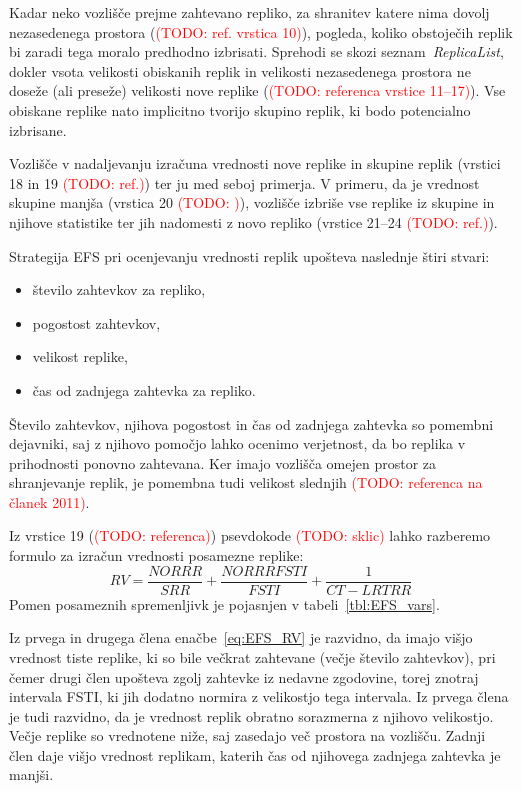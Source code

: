 \documentclass[a4paper, 12pt]{book}
\newcommand{\TODO}[1]{\textcolor{red}{(TODO: #1)}}
\begin{document}
Kadar neko vozlišče prejme zahtevano repliko, za shranitev katere nima dovolj
nezasedenega prostora (\TODO{ref. vrstica 10}), pogleda, koliko
obstoječih replik bi zaradi tega moralo predhodno izbrisati. Sprehodi se skozi
seznam~\textit{\mbox{ReplicaList}}, dokler vsota velikosti obiskanih replik in
velikosti nezasedenega prostora ne doseže (ali preseže) velikosti nove replike
(\TODO{referenca vrstice 11--17}). Vse obiskane replike nato implicitno
tvorijo skupino replik, ki bodo potencialno izbrisane.

Vozlišče v nadaljevanju izračuna vrednosti nove replike in skupine replik
(vrstici 18 in 19 \TODO{ref.}) ter ju med seboj primerja. V primeru, da je
vrednost skupine manjša (vrstica 20 \TODO{}), vozlišče izbriše vse replike
iz skupine in njihove statistike ter jih nadomesti z novo repliko
(vrstice 21--24 \TODO{ref.}).

Strategija EFS pri ocenjevanju vrednosti replik upošteva naslednje štiri
stvari:
\begin{itemize}
  \item število zahtevkov za repliko,
  \item pogostost zahtevkov,
  \item velikost replike,
  \item čas od zadnjega zahtevka za repliko.
\end{itemize}

Število zahtevkov, njihova pogostost in čas od zadnjega zahtevka so pomembni
dejavniki, saj z njihovo pomočjo lahko ocenimo verjetnost, da bo replika
v prihodnosti ponovno zahtevana. Ker imajo vozlišča omejen prostor za
shranjevanje replik, je pomembna tudi velikost slednjih
\TODO{referenca na članek 2011}.

\begin{samepage}
Iz vrstice 19 (\TODO{referenca}) psevdokode \TODO{sklic} lahko razberemo
formulo za izračun vrednosti posamezne replike:
\begin{equation}
  \mathit{RV} = \frac{\mathit{NORRR}}{\mathit{SRR}} +
                      \frac{\mathit{NORRRFSTI}}{\mathit{FSTI}} +
                      \frac{1}{\mathit{CT} - \mathit{LRTRR}}
  \label{eq:EFS_RV}
\end{equation}
Pomen posameznih spremenljivk je pojasnjen v tabeli~\ref{tbl:EFS_vars}.
\end{samepage}

Iz prvega in drugega člena enačbe~\eqref{eq:EFS_RV} je razvidno, da imajo
višjo vrednost tiste replike, ki so bile večkrat zahtevane (večje število
zahtevkov), pri čemer drugi člen upošteva zgolj zahtevke iz nedavne zgodovine,
torej znotraj intervala FSTI, ki jih dodatno normira z velikostjo tega
intervala. Iz prvega člena je tudi razvidno, da je vrednost replik obratno
sorazmerna z njihovo velikostjo. Večje replike so vrednotene niže, saj
zasedajo več prostora na vozlišču. Zadnji člen daje višjo vrednost replikam,
katerih čas od njihovega zadnjega zahtevka je manjši.
\end{document}
